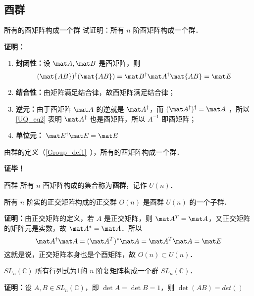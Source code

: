 \subsection{酉群}
\begin{example}{所有的酉矩阵构成一个群}
试证明：所有 $n$ 阶酉矩阵构成一个群．

\textbf{证明：}
\begin{enumerate}
\item \textbf{封闭性：}设 $\mat A,\mat B$ 是酉矩阵，则
\begin{equation}
(\mat{AB})^\dagger(\mat{AB})=\mat B^\dagger \mat A^\dagger\mat{AB}=\mat E
\end{equation}
\item \textbf{结合性：}由矩阵满足结合律，故酉矩阵满足结合律；
\item \textbf{逆元：}由于酉矩阵 $\mat A$ 的逆就是 $\mat A^\dagger$，而 $(\mat A^\dagger)^\dagger=\mat A$ ，所以\autoref{UQ_eq2} 表明 $\mat A^\dagger$ 也是酉矩阵，所以 $A^{-1}$ 即酉矩阵；
\item \textbf{单位元：} $\mat E^\dagger\mat E=\mat E$
\end{enumerate}
由群的定义（\autoref{Group_def1}~），所有的酉矩阵构成一个群．

\textbf{证毕！}
\end{example}
\begin{definition}{酉群}
所有 $n$ 酉矩阵构成的集合称为\textbf{酉群}，记作 $U(n)$．
\end{definition}
\begin{theorem}{}
所有 $n$ 阶实的正交矩阵构成的正交群 $O(n)$ 是酉群 $U(n)$ 的一个子群．
\end{theorem}
\textbf{证明：}由正交矩阵的定义，若 $A$ 是正交矩阵，则 $\mat A^T=\mat A$，又正交矩阵的矩阵元是实数，故 $\mat A^*=\mat A$．所以
\begin{equation}
\mat A^\dagger\mat A=(\mat A^T)^*\mat A=\mat A^T\mat A=\mat E
\end{equation}
这就是说，正交矩阵本身也是个酉矩阵，故 $O(n)\subset U(n)$．
\begin{theorem}{$SL_n(\mathbb{C})$}
所有行列式为1的 $n$ 阶复矩阵构成一个群 $SL_n(\mathbb{C})$．
\end{theorem}
\textbf{证明：}设 $A,B\in SL_n(\mathbb{C})$，即 $\det{A}=\det{B}=1$，则 $\det(AB)=det()$